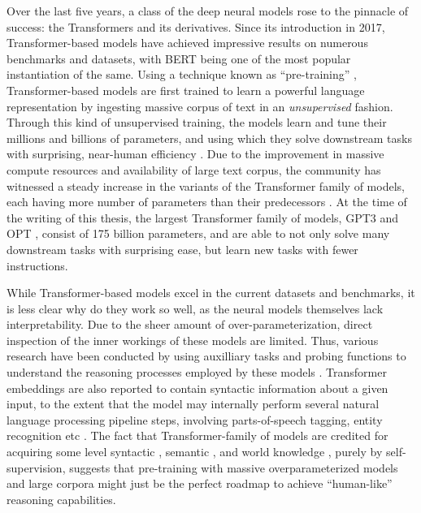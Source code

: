 \documentclass[letterpaper, 12pt]{report}
\begin{document}
Over the last five years, a class of the deep neural models rose to the pinnacle of success: the Transformers \citep{vaswani-etal-2017-attention} and its derivatives. Since its introduction in 2017, Transformer-based models have achieved impressive results on numerous benchmarks and datasets, with BERT \citep{devlin-etal-2019-bert} being one of the most popular instantiation of the same. Using a technique known as ``pre-training'' \citep{mikolov2013efficient, peters-etal-2018-deep}, Transformer-based models are first trained to learn a powerful language representation by ingesting massive corpus of text in an \textit{unsupervised} fashion. Through this kind of unsupervised training, the models learn and tune their millions and billions of parameters, and using which they solve downstream tasks with surprising, near-human efficiency \citep{devlin-etal-2019-bert,liu-et-al-2019-roberta,lewis-etal-2020-bart}. Due to the improvement in massive compute resources and availability of large text corpus, the community has witnessed a steady increase in the variants of the Transformer family of models, each having more number of parameters than their predecessors \citep{kaplan2020scaling}. At the time of the writing of this thesis, the largest Transformer family of models, GPT3 \citep{Brown2020:GPT3} and OPT \citep{Zhang2022:OPT}, consist of 175 billion parameters, and are able to not only solve many downstream tasks with surprising ease, but learn new tasks with fewer instructions.

While Transformer-based models excel in the current datasets and benchmarks, it is less clear why do they work so well, as the neural models themselves lack interpretability. Due to the sheer amount of over-parameterization, direct inspection of the inner workings of these models are limited. Thus, various research have been conducted by using auxilliary tasks and probing functions to understand the reasoning processes employed by these models \citep{rogers-etal-2020-primer}. Transformer embeddings are also reported to contain syntactic information about a given input, to the extent that the model may internally perform several natural language processing pipeline steps, involving parts-of-speech tagging, entity recognition etc \citep{tenney-etal-2019-bert}. The fact that Transformer-family of models are credited for acquiring some level syntactic \citep{hewitt-manning-2019-structural,jawahar-etal-2019-bert}, semantic \citep{ettinger-2020-whatbertisnot}, and world knowledge \citep{petroni-etal-2019-language, rogers-etal-2020-primer}, purely by self-supervision, suggests that pre-training with massive overparameterized models and large corpora might just be the perfect roadmap to achieve ``human-like'' reasoning capabilities.
\end{document}
